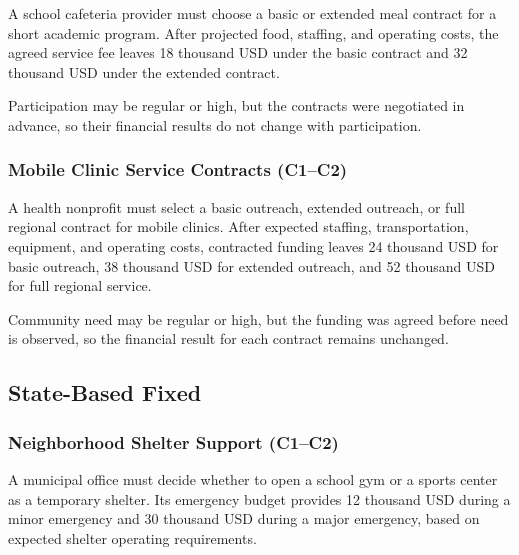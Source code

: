 	A school cafeteria provider must choose a basic or extended meal contract for a short academic program. After projected food, staffing, and operating costs, the agreed service fee leaves 18 thousand USD under the basic contract and 32 thousand USD under the extended contract.
	
	Participation may be regular or high, but the contracts were negotiated in advance, so their financial results do not change with participation.
	
	\subsubsection{Mobile Clinic Service Contracts (C1--C2)}
	\label{sec:problem11-mobile-clinic-service-contracts-c1-c2}
	
	A health nonprofit must select a basic outreach, extended outreach, or full regional contract for mobile clinics. After expected staffing, transportation, equipment, and operating costs, contracted funding leaves 24 thousand USD for basic outreach, 38 thousand USD for extended outreach, and 52 thousand USD for full regional service.
	
	Community need may be regular or high, but the funding was agreed before need is observed, so the financial result for each contract remains unchanged.

	
	\subsection{State-Based Fixed}
	\label{sec:state-based-fixed-payoff-only}



	\subsubsection{Neighborhood Shelter Support (C1--C2)}
	\label{sec:problem12-neighborhood-shelter-support-c1-c2}
	
	A municipal office must decide whether to open a school gym or a sports center as a temporary shelter. Its emergency budget provides 12 thousand USD during a minor emergency and 30 thousand USD during a major emergency, based on expected shelter operating requirements.
	
